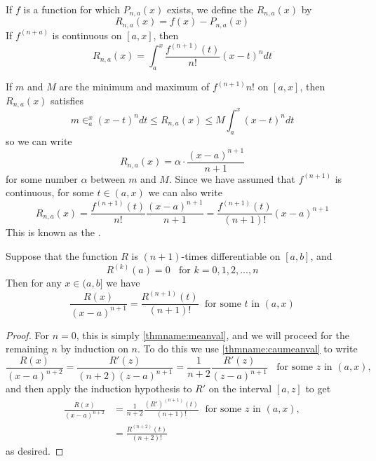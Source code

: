 \begin{defn}
    If $f$ is a function for which $P_{n,a}(x)$ exists, we define the  $R_{n,a}(x)$ by \begin{equation*}
        R_{n,a}(x) = f(x) - P_{n,a}(x)
    \end{equation*}
    If $f^{(n+a)}$ is continuous on $[a,x]$, then \begin{equation*}
        R_{n,a}(x) = \int_a^x\frac{f^{(n+1)}(t)}{n!}(x-t)^ndt
    \end{equation*}
\end{defn}

\begin{rmk}
    If $m$ and $M$ are the minimum and maximum of $f^{(n+1)}{n!}$ on $[a,x]$, then $R_{n,a}(x)$ satisfies \begin{equation*}
        m\in_a^x(x-t)^ndt\leq R_{n,a}(x)\leq M\int_a^x(x-t)^ndt
    \end{equation*}
    so we can write \begin{equation*}
        R_{n,a}(x) = \alpha\cdot \frac{(x-a)^{n+1}}{n+1}
    \end{equation*}
    for some number $\alpha$ between $m$ and $M$. Since we have assumed that $f^{(n+1)}$ is continuous, for some $t \in (a,x)$ we can also write \begin{equation*}
        R_{n,a}(x) = \frac{f^{(n+1)}(t)}{n!}\frac{(x-a)^{n+1}}{n+1} = \frac{f^{(n+1)}(t)}{(n+1)!}(x-a)^{n+1}
    \end{equation*}
    This is known as the .
\end{rmk}


\begin{lem}
    Suppose that the function $R$ is $(n+1)$-times differentiable on $[a,b]$, and \begin{equation*}
        R^{(k)}(a) = 0\;\;\text{ for } k =0,1,2,...,n
    \end{equation*}
    Then for any $x \in (a,b]$ we have \begin{equation*}
        \frac{R(x)}{(x-a)^{n+1}} = \frac{R^{(n+1)}(t)}{(n+1)!}\;\text{ for some $t$ in } (a,x)
    \end{equation*}
\end{lem}
\begin{proof}
    For $n = 0$, this is simply \ref{thmname:meanval}, and we will proceed for the remaining $n$ by induction on $n$. To do this we use \ref{thmname:caumeanval} to write \begin{equation*}
        \frac{R(x)}{(x-a)^{n+2}} = \frac{R'(z)}{(n+2)(z-a)^{n+1}} = \frac{1}{n+2}\frac{R'(z)}{(z-a)^{n+1}}\;\;\text{ for some $z$ in } (a,x),
    \end{equation*}
    and then apply the induction hypothesis to $R'$ on the interval $[a,z]$ to get \begin{align*}
        \frac{R(x)}{(x-a)^{n+2}} &= \frac{1}{n+2}\frac{(R')^{(n+1)}(t)}{(n+1)!}\;\text{ for some $z$ in } (a,x), \\
        &= \frac{R^{(n+2)}(t)}{(n+2)!}
    \end{align*}
    as desired.
\end{proof}

